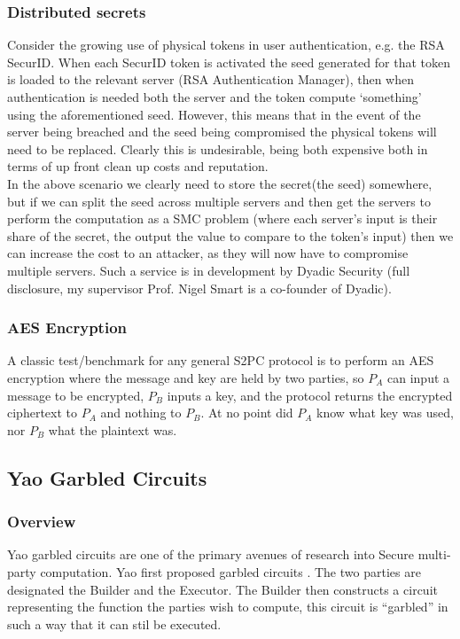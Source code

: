 \documentclass[a4paper,10pt]{article}
\begin{document}
			\subsubsection{Distributed secrets} \label{DistributedSecretApplication}
				Consider the growing use of physical tokens in user authentication, e.g. the RSA SecurID. When each SecurID token is activated the seed generated for that token is loaded to the relevant server (RSA Authentication Manager), then when authentication is needed both the server and the token compute `something' using the aforementioned seed. However, this means that in the event of the server being breached and the seed being compromised the physical tokens will need to be replaced. Clearly this is undesirable, being both expensive both in terms of up front clean up costs and reputation.\\

				In the above scenario we clearly need to store the secret(the seed) somewhere, but if we can split the seed across multiple servers and then get the servers to perform the computation as a SMC problem (where each server's input is their share of the secret, the output the value to compare to the token's input) then we can increase the cost to an attacker, as they will now have to compromise multiple servers. Such a service is in development by Dyadic Security (full disclosure, my supervisor Prof. Nigel Smart is a co-founder of Dyadic).

			\subsubsection{AES Encryption} \label{AES_Application}
				A classic test/benchmark for any general S2PC protocol is to perform an AES encryption where the message and key are held by two parties, so $P_A$ can input a message to be encrypted, $P_B$ inputs a key, and the protocol returns the encrypted ciphertext to $P_A$ and nothing to $P_B$. At no point did $P_A$ know what key was used, nor $P_B$ what the plaintext was.


		\subsection{Yao Garbled Circuits} \label{Yao_Circuits}

			\subsubsection{Overview} \label{Yao_Overview}
				Yao garbled circuits are one of the primary avenues of research into Secure multi-party computation. Yao first proposed garbled circuits \cite{YaoOriginal}. The two parties are designated the Builder and the Executor. The Builder then constructs a circuit representing the function the parties wish to compute, this circuit is ``garbled'' in such a way that it can stil be executed.\\
\end{document}
